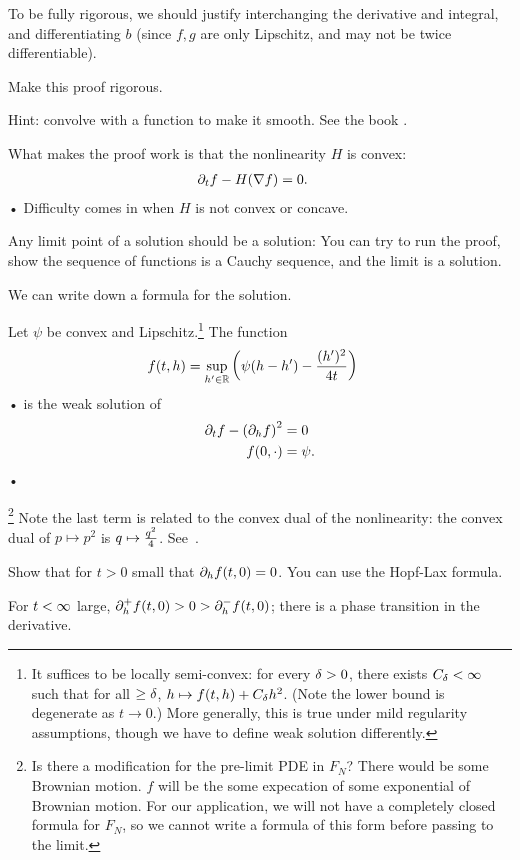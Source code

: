 To be fully rigorous, we should justify interchanging the derivative and integral, and differentiating $b$ (since $f,g$ are only Lipschitz, and may not be twice differentiable).
\begin{exr}
Make this proof rigorous.

Hint: convolve with a function to make it smooth. See the book \cite{evans2010partial}.
\end{exr}
What makes the proof work is that the nonlinearity $H$ is convex:
\begin{align*}
\partial_t f - H(\nabla f)&=0.
\end{align*}•
Difficulty comes in when $H$ is not convex or concave.

Any limit point of a solution should be a solution: You can try to run the proof, show the sequence of functions is a Cauchy sequence, and the limit is a solution.

We can write down a formula for the solution.
\begin{pr}
Let $\psi$ be convex and Lipschitz.\footnote{It suffices to be locally semi-convex: for every $\delta>0$, there exists $C_\delta<\infty$ such that for all $\ge \delta$, $h\mapsto f(t,h) + C_\delta h^2$.
(Note the lower bound is degenerate as $t\to 0$.)
More generally, this is true under mild regularity assumptions, though we have to define weak solution differently.} 
The function
\begin{align*}
f(t,h) &= \sup_{h'\in \mathbb{R}} \left( {\psi(h-h') - \frac{(h')^2}{4t}} \right)
\end{align*}•
is the weak solution of
\begin{align*}
\partial_t f - \left( {\partial_h f} \right)^2 &=0\\
f(0,\cdot)&=\psi.
\end{align*}•
\end{pr}
\footnote{Is there a modification for the pre-limit PDE in $F_N$? There would be some Brownian motion. $f$ will be the some expecation of some exponential of Brownian motion. For our application, we will not have a completely closed formula for $F_N$, so we cannot write a formula of this form before passing to the limit.}
Note the last term is related to the convex dual of the nonlinearity: the convex dual of $p\mapsto p^2$ is $q\mapsto \frac{q^2}{4}$. See~\cite{evans2010partial}.
\begin{exr}
Show that for $t>0$ small that $\partial_h f(t,0) = 0$. You can use the Hopf-Lax formula.

For $t<\infty$ large, $\partial_h^+f(t,0)>0> \partial_h^-f(t,0)$; there is a phase transition in the derivative. %
\end{exr}

